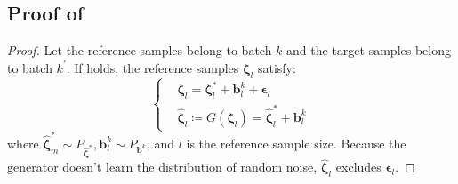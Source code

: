 \documentclass{article}
\begin{document}
\subsection{Proof of }\label{proof:trans}
\begin{proof}
Let the reference samples belong to batch $k$ and the target samples belong to batch $k^\prime$.
If  holds, the reference samples $\bm{\zeta}_l$ satisfy:
\begin{equation}
    \begin{cases}
        & \bm{\zeta}_l = \bm{\zeta}_l^* + \bm{b}_l^k + \bm{\epsilon}_l \\
        &  \widehat{\bm{\zeta}}_l \coloneqq G(\bm{\zeta}_l) = \widehat{\bm{\zeta}}_l^* + \bm{b}_l^k
    \end{cases}
\end{equation}
where $\widehat{\bm{\zeta}}_m^* \sim P_{\widehat{\bm{\zeta}}^*}, \bm{b}_l^k \sim P_{\bm{b}^k}$, and $l$ is the reference sample size.
Because the generator doesn't learn the distribution of random noise, $\widehat{\bm{\zeta}}_l$ excludes $\bm{\epsilon}_l$.


\end{proof}
\end{document}
